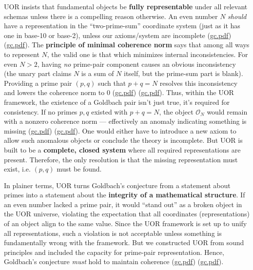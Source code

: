 \documentclass[12pt]{article}
\begin{document}
UOR insists that fundamental objects be \textbf{fully representable} under all relevant schemas unless there is a compelling reason otherwise. An even number $N$ \emph{should} have a representation in the ``two-prime-sum'' coordinate system (just as it has one in base-10 or base-2), unless our axioms/system are incomplete (\href{file://file-7ZYYwSHWVa83XEVTrEhg5z#:~:text=ideally%20reaching%20zero%20if%20all,out%20as%20having%20an%20irreducible}{gc.pdf}) (\href{file://file-7ZYYwSHWVa83XEVTrEhg5z#:~:text=If%20no%20primes%20existed%20to,evidence%20that%20our%20axioms%20or}{gc.pdf}). The \textbf{principle of minimal coherence norm} says that among all ways to represent $N$, the valid one is that which minimizes internal inconsistencies. For even $N>2$, having \emph{no} prime-pair component causes an obvious inconsistency (the unary part claims $N$ is a sum of $N$ itself, but the prime-sum part is blank). Providing a prime pair $(p,q)$ such that $p+q=N$ resolves this inconsistency and lowers the coherence norm to 0 (\href{file://file-7ZYYwSHWVa83XEVTrEhg5z#:~:text=that%20the%20true%20representation%20of,If%20no}{gc.pdf}) (\href{file://file-7ZYYwSHWVa83XEVTrEhg5z#:~:text=%28Appendix,evidence%20that%20our%20axioms%20or}{gc.pdf}). Thus, within the UOR framework, the existence of a Goldbach pair isn’t just true, it’s required for consistency. If no primes $p,q$ existed with $p+q=N$, the object $\mathcal{O}_N$ would remain with a nonzero coherence norm --- effectively an anomaly indicating something is missing (\href{file://file-7ZYYwSHWVa83XEVTrEhg5z#:~:text=%24%5Cmathcal,realize%20it%2C%20the%20discrepancy%20is}{gc.pdf}) (\href{file://file-7ZYYwSHWVa83XEVTrEhg5z#:~:text=primes%20existed%20to%20do%20this%2C,evidence%20that%20our%20axioms%20or}{gc.pdf}). One would either have to introduce a new axiom to allow such anomalous objects or conclude the theory is incomplete. But UOR is built to be a \textbf{complete, closed system} where all required representations are present. Therefore, the only resolution is that the missing representation must exist, i.e. $(p,q)$ must be found.

In plainer terms, UOR turns Goldbach’s conjecture from a statement about primes into a statement about the \textbf{integrity of a mathematical structure}. If an even number lacked a prime pair, it would “stand out” as a broken object in the UOR universe, violating the expectation that all coordinates (representations) of an object align to the same value. Since the UOR framework is set up to unify all representations, such a violation is not acceptable unless something is fundamentally wrong with the framework. But we constructed UOR from sound principles and included the capacity for prime-pair representation. Hence, Goldbach’s conjecture \emph{must} hold to maintain coherence (\href{file://file-7ZYYwSHWVa83XEVTrEhg5z#:~:text=primes%20existed%20to%20do%20this%2C,evidence%20that%20our%20axioms%20or}{gc.pdf}) (\href{file://file-7ZYYwSHWVa83XEVTrEhg5z#:~:text=inconsistency,evidence%20that%20our%20axioms%20or}{gc.pdf}).
\end{document}
